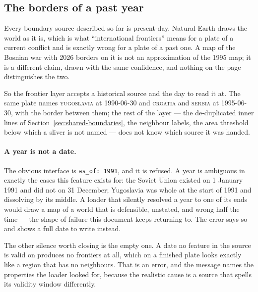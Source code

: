 \documentclass[11pt]{article}
\begin{document}
\subsection{The borders of a past year}
\label{sec:historical-frontiers}

Every boundary source described so far is present-day. Natural Earth draws
the world as it is, which is what ``international frontiers'' means for a
plate of a current conflict and is exactly wrong for a plate of a past one. A
map of the Bosnian war with 2026 borders on it is not an approximation of the
1995 map; it is a different claim, drawn with the same confidence, and nothing
on the page distinguishes the two.

So the frontier layer accepts a historical source and the day to read it at.
The same plate names \textsc{yugoslavia} at 1990-06-30 and \textsc{croatia}
and \textsc{serbia} at 1995-06-30, with the border between them; the rest of
the layer --- the de-duplicated inner lines of
Section~\ref{sec:shared-boundaries}, the neighbour labels, the area threshold
below which a sliver is not named --- does not know which source it was
handed.

\paragraph{A year is not a date.} The obvious interface is
\texttt{as\_of: 1991}, and it is refused. A year is ambiguous in exactly the
cases this feature exists for: the Soviet Union existed on 1 January 1991 and
did not on 31 December; Yugoslavia was whole at the start of 1991 and
dissolving by its middle. A loader that silently resolved a year to one of its
ends would draw a map of a world that is defensible, unstated, and wrong half
the time --- the shape of failure this document keeps returning to. The error
says so and shows a full date to write instead.

The other silence worth closing is the empty one. A date no feature in the
source is valid on produces no frontiers at all, which on a finished plate
looks exactly like a region that has no neighbours. That is an error, and the
message names the properties the loader looked for, because the realistic
cause is a source that spells its validity window differently.
\end{document}
